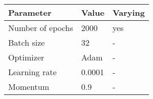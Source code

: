 \begin{table}[ht!]
\scriptsize
\begin{center}
\begin{tabular}{ M{4cm}  M{1.5cm} M{1.5cm}}
\toprule
\textbf{Parameter} & \textbf{Value} & \textbf{Varying} \\
\midrule
Number of epochs & 2000 & yes\\
Batch size & 32 & -\\
\midrule
Optimizer & Adam & -\\
Learning rate & 0.0001 & -\\
Momentum & 0.9 & -\\
\bottomrule
\end{tabular}
\end{center}
\end{table}